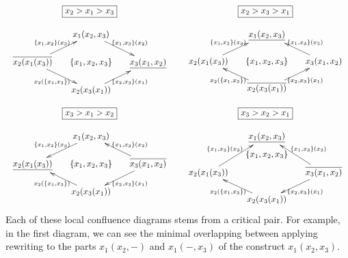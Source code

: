 \medskip
$$\begin{array}{ccc}
\boxed{x_2>x_1>x_3} && \boxed{x_2>x_3>x_1}\\
&&\\
\xymatrix @-1.65pc {&&x_1(x_2,x_3) \ar @{<-}[ddll]_{\set{x_1,x_2}(x_3)} \ar @{->}[ddrr]^{\set{x_1,x_3}(x_2)}&& \\
&&&&\\
\overline{x_2(x_1(x_3))} \ar @{->}[ddrr]_{x_2(\set{x_1,x_3})}&& \set{x_1,x_2,x_3}  && \underline{x_3(x_1,x_2)}\ar @{<-}[ddll]^{\set{x_2,x_3}(x_1)}\\
&&&&\\
&& x_2(x_3(x_1))&&}
&&


\xymatrix @-1.65pc{&&  \underline{x_1(x_2,x_3)} \ar @{<-}[ddll]_{\set{x_1,x_2}(x_3)} \ar @{<-}[ddrr]^{\set{x_1,x_3}(x_2)}&& \\
&&&&\\
x_2(x_1(x_3)) \ar @{<-}[ddrr]_{x_2(\set{x_1,x_3})}&& \set{x_1,x_2,x_3}  && x_3(x_1,x_2)\ar @{<-}[ddll]^{\set{x_2,x_3}(x_1)}\\
&&&&\\
&&   \overline{x_2(x_3(x_1))}&&}
 \end{array}
$$

$$\begin{array}{ccc}
\boxed{x_3>x_1>x_2} && \boxed{x_3>x_2>x_1}\\
&&\\
\xymatrix @-1.65pc {&& x_1(x_2,x_3) \ar @{->}[ddll]_{\set{x_1,x_2}(x_3)} \ar @{<-}[ddrr]^{\set{x_1,x_3}(x_2)}&& \\
&&&&\\
\underline{x_2(x_1(x_3))} \ar @{<-}[ddrr]_{x_2(\set{x_1,x_3})}&& \set{x_1,x_2,x_3}  && \overline{x_3(x_1,x_2)}\ar @{->}[ddll]^{\set{x_2,x_3}(x_1)}\\
&&&&\\
&&  x_2(x_3(x_1))&&}
&&


\xymatrix @-1.65pc {&& \underline{x_1(x_2,x_3)} \ar @{<-}[ddll]_{\set{x_1,x_2}(x_3)} \ar @{<-}[ddrr]^{\set{x_1,x_3}(x_2)}&& \\
&&\set{x_1,x_2,x_3}&&\\
x_2(x_1(x_3)) \ar @{<-}[ddrr]_{x_2(\set{x_1,x_3})}&&   && \overline{x_3(x_1,x_2)}\ar @{->}[ddll]^{\set{x_2,x_3}(x_1)}\\
&&&&\\
&&  x_2(x_3(x_1))&&}
  \end{array}
$$
Each of these local confluence diagrams stems from a critical pair. 
For example, in the first diagram, we can see the minimal overlapping between applying rewriting to the parts $x_1(x_2,-)$ and $x_1(-,x_3)$ of the construct $x_1(x_2,x_3)$. 

